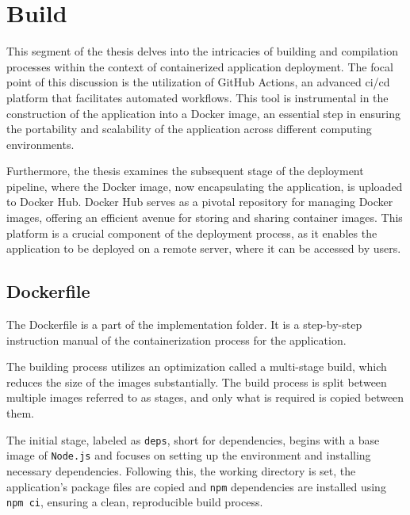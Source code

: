 \section{Build}
\label{sec:build}


This segment of the thesis delves into the intricacies of building and compilation processes within the context of containerized application deployment. The focal point of this discussion is the utilization of GitHub Actions, an advanced \acrshort{ci}/\acrshort{cd} platform that facilitates automated workflows. This tool is instrumental in the construction of the application into a Docker image, an essential step in ensuring the portability and scalability of the application across different computing environments.\cite{what-is-docker-image}

Furthermore, the thesis examines the subsequent stage of the deployment pipeline, where the Docker image, now encapsulating the application, is uploaded to Docker Hub. Docker Hub serves as a pivotal repository for managing Docker images, offering an efficient avenue for storing and sharing container images. This platform is a crucial component of the deployment process, as it enables the application to be deployed on a remote server, where it can be accessed by users.\cite{what-is-docker-hub}

\subsection{Dockerfile}
\label{sec:dockerfile}
The Dockerfile is a part of the implementation folder. It is a step-by-step instruction manual of the containerization process for the application.

The building process utilizes an optimization called a multi-stage build, which reduces the size of the images substantially\cite{docker}. The build process is split between multiple images referred to as stages, and only what is required is copied between them.

The initial stage, labeled as \texttt{deps}, short for dependencies, begins with a base image of \texttt{Node.js} and focuses on setting up the environment and installing necessary dependencies. Following this, the working directory is set, the application's package files are copied and \texttt{npm} dependencies are installed using \texttt{npm ci}, ensuring a clean, reproducible build process.\cite{npm-ci}

